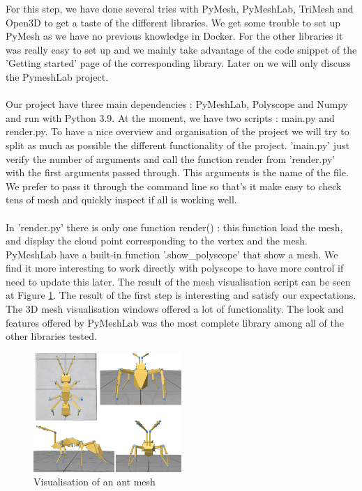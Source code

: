 \documentclass[10pt,twocolumn,letterpaper]{article}
\begin{document}
	For this step, we have done several tries with PyMesh, PyMeshLab, TriMesh and Open3D to get a taste of the different libraries. We get some trouble to set up PyMesh as we have no previous knowledge in Docker. For the other libraries it was really easy to set up and we mainly take advantage of the code snippet of the 'Getting started' page of the corresponding library.  Later on  we will only discuss the PymeshLab project. \\ \\
	Our project have three main dependencies : PyMeshLab, Polyscope and Numpy and run with Python 3.9. At the moment, we have two scripts : main.py and render.py. To have a nice overview and organisation of  the project we will try to split as much as possible the different functionality of the project. 'main.py' just verify the number of arguments and call the function render from 'render.py' with the first arguments passed through. This arguments is the name of the file. We prefer to pass it through the command line so that's it make easy to check tens of mesh and quickly inspect if all is working well. \\ \\
	In 'render.py' there is only one function render() : this function load the mesh, and display the cloud point corresponding to the vertex and the mesh. PyMeshLab have a built-in function '.show\_polyscope' that show a mesh. We find it more interesting to work directly with polyscope to have more control if need to update this later. The result of the mesh visualisation script can be seen at Figure \ref{fig:ant-mesh}. The result of the first step is interesting and satisfy our expectations. The 3D mesh visualisation windows offered a lot of functionality. The look and features offered by PyMeshLab was the most complete library among all of the other libraries tested. 
\begin{figure}
\begin{center}
  \includegraphics[width=0.5\textwidth]{ant}
  \caption{Visualisation of an ant mesh}
  \label{fig:ant-mesh}
  \end{center}
\end{figure}
\medskip
\printbibliography
\end{document}
